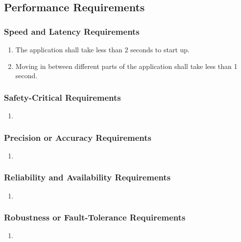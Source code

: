 \documentclass[]{article}
\begin{document}
\subsection{Performance Requirements}
\label{sub:performance_requirements}

\subsubsection{Speed and Latency Requirements}
\label{ssub:speed_and_latency_requirements}
\begin{enumerate}[{PR}1. ]
	\item The application shall take less than 2 seconds to start up.
	\item Moving in between different parts of the application shall take less than 
1 second.
\end{enumerate}

\subsubsection{Safety-Critical Requirements}
\label{ssub:safety_critical_requirements}
\begin{enumerate}[{PR}1. ]
	\item
\end{enumerate}

\subsubsection{Precision or Accuracy Requirements}
\label{ssub:precision_or_accuracy_requirements}
\begin{enumerate}[{PR}1. ]
	\item
\end{enumerate}

\subsubsection{Reliability and Availability Requirements}
\label{ssub:reliability_and_availability_requirements}
\begin{enumerate}[{PR}1. ]
	\item
\end{enumerate}

\subsubsection{Robustness or Fault-Tolerance Requirements}
\label{ssub:robustness_or_fault_tolerance_requirements}
\begin{enumerate}[{PR}1. ]
	\item
\end{enumerate}
\end{document}
